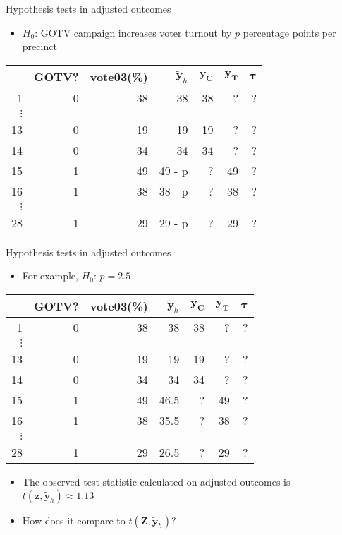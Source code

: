 \documentclass[table, xcolor = {dvipsnames}, 9pt]{beamer}
\theoremstyle{plain}
\begin{document}
\begin{frame}{Hypothesis tests in adjusted outcomes}
\begin{itemize}
\item $H_0$: GOTV campaign increases voter turnout by $p$ percentage points per precinct  
\end{itemize}
\begin{center}
  \begin{tabular}{r|rr|rrrr}
  \hline
 & GOTV? & vote03(\%)& $\bm{\tilde{y}}_h$ & $\bm{y_C}$ & $\bm{y_T}$ & $\bm{\tau}$\\
  \hline
1 & 0 & 38 & 38 & 38 & ? & ?\\
$\vdots$& & & & & & \\
13 & 0 & 19 & 19 & 19& ? & ?\\
14 & 0 & 34 & 34 & 34& ? & ?\\
15 & 1 & 49 & 49 - p & ?& 49 & ?\\
16 & 1 & 38 & 38 - p & ?& 38 & ?\\
$\vdots$& & & & & & \\
28 & 1 & 29 & 29 - p & ?& 29 & ? \\
   \hline
\end{tabular}
\end{center}
\end{frame}
\begin{frame}{Hypothesis tests in adjusted outcomes}
\begin{itemize}
\item For example, $H_0$: $p = 2.5$  
\end{itemize}
\begin{center}
  \begin{tabular}{r|rr|rrrr}
  \hline
 & GOTV? & vote03(\%)& $\bm{\tilde{y}}_h$ & $\bm{y_C}$ & $\bm{y_T}$ & $\bm{\tau}$\\
  \hline
1 & 0 & 38 & 38 & 38 & ? & ?\\
$\vdots$& & & & & & \\
13 & 0 & 19 & 19 & 19& ? & ?\\
14 & 0 & 34 & 34 & 34& ? & ?\\
15 & 1 & 49 & 46.5 & ?& 49 & ?\\
16 & 1 & 38 & 35.5 & ?& 38 & ?\\
$\vdots$& & & & & & \\
28 & 1 & 29 & 26.5 & ?& 29 & ? \\
   \hline
\end{tabular}
\end{center}
\begin{itemize}
\item The observed test statistic calculated on adjusted outcomes is $t(\bm{z}, \bm{\tilde{y}}_h) \approx 1.13$
\item How does it compare to $t\left(\bm{Z}, \bm{\tilde{y}}_h\right)$?
\end{itemize}
\end{frame}
\end{document}
